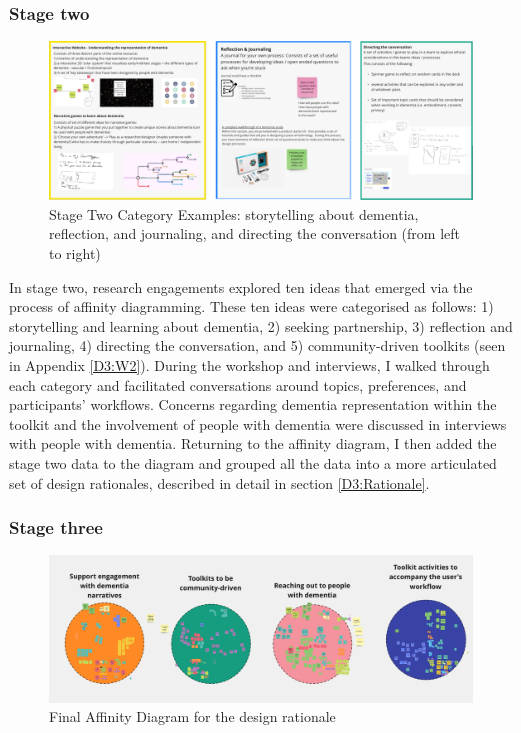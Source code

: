 \subsubsection{Stage two}
\begin{figure}[h]
\centering
\includegraphics[width=1\linewidth]{Images/D3Toolkit/Fig2.png}
\caption{Stage Two Category Examples: storytelling about dementia, reflection, and journaling, and directing the conversation (from left to right)}
\label{fig:StageTwoDesigns}
\end{figure}
In stage two, research engagements explored ten ideas that emerged via the process of affinity diagramming. These ten ideas were categorised as follows: 1) storytelling and learning about dementia, 2) seeking partnership, 3) reflection and journaling, 4) directing the conversation, and 5) community-driven toolkits (seen in Appendix \ref{D3:W2}). During the workshop and interviews, I walked through each category and facilitated conversations around topics, preferences, and participants’ workflows. Concerns regarding dementia representation within the toolkit and the involvement of people with dementia were discussed in interviews with people with dementia. Returning to the affinity diagram, I then added the stage two data to the diagram and grouped all the data into a more articulated set of design rationales, described in detail in section \ref{D3:Rationale}.


\subsubsection{Stage three}
\begin{figure}[h]
\centering
\includegraphics[width=1\linewidth]{Images/D3Toolkit/Fig3.png}
\caption{Final Affinity Diagram for the design rationale}
\label{fig:AffinityDiagram}
\end{figure}

